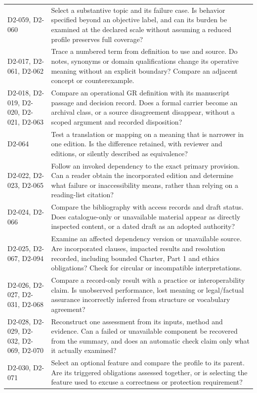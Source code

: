 \documentclass[11pt,a4paper]{article}
\begin{document}
\begin{longtable}{L{0.26\textwidth}L{0.64\textwidth}}
D2-059, D2-060 & Select a substantive topic and its failure case. Is behavior specified beyond an objective label, and can its burden be examined at the declared scale without assuming a reduced profile preserves full coverage?\\
D2-017, D2-061, D2-062 & Trace a numbered term from definition to use and source. Do notes, synonyms or domain qualifications change its operative meaning without an explicit boundary? Compare an adjacent concept or counterexample.\\
D2-018, D2-019, D2-020, D2-021, D2-063 & Compare an operational GR definition with its manuscript passage and decision record. Does a formal carrier become an archival class, or a source disagreement disappear, without a scoped argument and recorded disposition?\\
D2-064 & Test a translation or mapping on a meaning that is narrower in one edition. Is the difference retained, with reviewer and editions, or silently described as equivalence?\\
D2-022, D2-023, D2-065 & Follow an invoked dependency to the exact primary provision. Can a reader obtain the incorporated edition and determine what failure or inaccessibility means, rather than relying on a reading-list citation?\\
D2-024, D2-066 & Compare the bibliography with access records and draft status. Does catalogue-only or unavailable material appear as directly inspected content, or a dated draft as an adopted authority?\\
D2-025, D2-067, D2-094 & Examine an affected dependency version or unavailable source. Are incorporated clauses, impacted results and resolution recorded, including bounded Charter, Part 1 and ethics obligations? Check for circular or incompatible interpretations.\\
D2-026, D2-027, D2-031, D2-068 & Compare a record-only result with a practice or interoperability claim. Is unobserved performance, lost meaning or legal/factual assurance incorrectly inferred from structure or vocabulary agreement?\\
D2-028, D2-029, D2-032, D2-069, D2-070 & Reconstruct one assessment from its inputs, method and evidence. Can a failed or unavailable component be recovered from the summary, and does an automatic check claim only what it actually examined?\\
D2-030, D2-071 & Select an optional feature and compare the profile to its parent. Are its triggered obligations assessed together, or is selecting the feature used to excuse a correctness or protection requirement?\\

\end{longtable}
\end{document}
